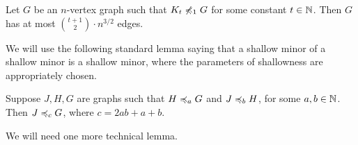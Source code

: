 \begin{corollary}\label{crl:densitynd}
  Let $G$ be an $n$-vertex graph such that $K_t\not\preccurlyeq_1 G$ for
  some constant $t\in \mathbb{N}$. Then $G$ has at most
  $\binom{t+1}{2}\cdot n^{3/2}$ edges.
\end{corollary}

We will use the following standard lemma saying that a shallow minor
of a shallow minor is a shallow minor, where the parameters of
shallowness are appropriately chosen.

\begin{lemma}\label{lem:combineminors}
  Suppose $J,H,G$ are graphs such that $H\preccurlyeq_a G$ and
  $J\preccurlyeq_b H$, for some $a,b\in \mathbb{N}$.  Then $J\preccurlyeq_c G$, where
  $c=2ab+a+b$.
\end{lemma}

We will need one more technical lemma.

